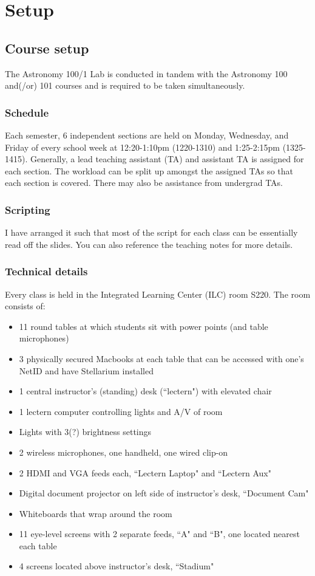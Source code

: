 \documentclass[12pt]{article}
\begin{document}
\section{Setup}
\subsection{Course setup}
The Astronomy 100/1 Lab is conducted in tandem with the Astronomy 100 and(/or) 101 courses and is required to be taken simultaneously.

\subsubsection{Schedule}
Each semester, 6 independent sections are held on Monday, Wednesday, and Friday of every school week at 12:20-1:10pm (1220-1310) and 1:25-2:15pm (1325-1415). Generally, a lead teaching assistant (TA) and assistant TA is assigned for each section. The workload can be split up amongst the assigned TAs so that each section is covered. There may also be assistance from undergrad TAs.

\subsubsection{Scripting}
I have arranged it such that most of the script for each class can be essentially read off the slides. You can also reference the teaching notes for more details.

\subsubsection{Technical details}
Every class is held in the Integrated Learning Center (ILC) room S220. The room consists of:
\begin{itemize}
    \item 11 round tables at which students sit with power points (and table microphones)
    \item 3 physically secured Macbooks at each table that can be accessed with one’s NetID and have Stellarium installed
    \item 1 central instructor’s (standing) desk (“lectern") with elevated chair
    \item 1 lectern computer controlling lights and A/V of room
    \item Lights with 3(?) brightness settings
    \item 2 wireless microphones, one handheld, one wired clip-on
    \item 2 HDMI and VGA feeds each, “Lectern Laptop" and “Lectern Aux"
    \item Digital document projector on left side of instructor’s desk, “Document Cam"
    \item Whiteboards that wrap around the room
    \item 11 eye-level screens with 2 separate feeds, “A" and “B", one located nearest each table
    \item 4 screens located above instructor’s desk, “Stadium"
\end{itemize}
\end{document}
